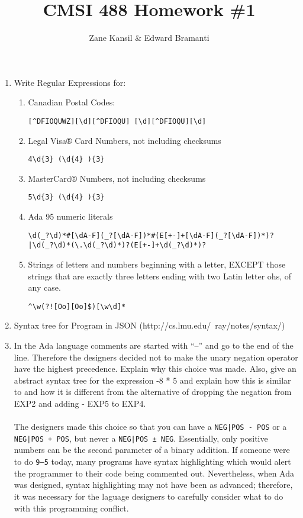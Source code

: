 \documentclass{article}
\begin{document}
\title{CMSI 488 Homework \#1}
\author{Zane Kansil \& Edward Bramanti}
\maketitle
\begin{enumerate}
\item Write Regular Expressions for:
\begin{enumerate}
\item Canadian Postal Codes:
\begin{verbatim}
[^DFIOQUWZ][\d][^DFIOQU] [\d][^DFIOQU][\d]
\end{verbatim}
\item Legal Visa® Card Numbers, not including checksums
\begin{verbatim}
4\d{3} (\d{4} ){3}
\end{verbatim}
\item MasterCard® Numbers, not including checksums
\begin{verbatim}
5\d{3} (\d{4} ){3}
\end{verbatim}
\item Ada 95 numeric literals
\begin{verbatim}
\d(_?\d)*#[\dA-F](_?[\dA-F])*#(E[+-]+[\dA-F](_?[\dA-F])*)?
|\d(_?\d)*(\.\d(_?\d)*)?(E[+-]+\d(_?\d)*)?
\end{verbatim}
\item Strings of letters and numbers beginning with a letter, EXCEPT those strings that are exactly three letters ending with two Latin letter ohs, of any case.
\begin{verbatim}
^\w(?![Oo][Oo]$)[\w\d]*
\end{verbatim}
\end{enumerate}
\pagebreak
\item Syntax tree for Program in JSON (http://cs.lmu.edu/~ray/notes/syntax/)

\pagebreak
\item In the Ada language comments are started with ``--'' and go to the end of the line. Therefore the designers decided not to make the unary negation operator have the highest precedence. Explain why this choice was made. Also, give an abstract syntax tree for the expression -8 * 5 and explain how this is similar to and how it is different from the alternative of dropping the negation from EXP2 and adding - EXP5 to EXP4. \\
\\
The designers made this choice so that you can have a \texttt{NEG|POS - POS} or a \texttt{NEG|POS + POS}, but never a \texttt{NEG|POS ± NEG}. Essentially, only positive numbers can be the second parameter of a binary addition. If someone were to do \texttt{9--5} today, many programs have syntax highlighting which would alert the programmer to their code being commented out. Nevertheless, when Ada was designed, syntax highlighting may not have been as advanced; therefore, it was necessary for the laguage designers to carefully consider what to do with this programming conflict.

\end{enumerate}
\end{document}
